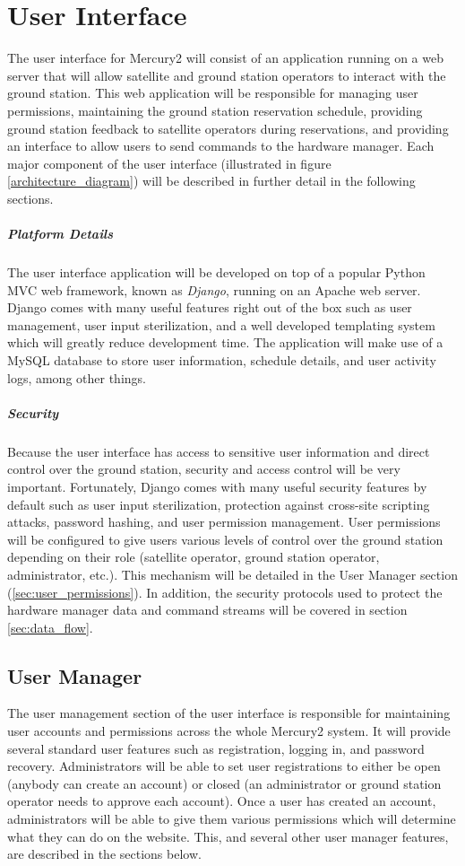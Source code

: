 \documentclass{mxl-design}
\begin{document}
\section{User Interface}
\label{sec:user_interface}
The user interface for Mercury2 will consist of an application running on a web server that will allow satellite and ground station operators to interact with the ground station. This web application will be responsible for managing user permissions, maintaining the ground station reservation schedule, providing ground station feedback to satellite operators during reservations, and providing an interface to allow users to send commands to the hardware manager. Each major component of the user interface (illustrated in figure \ref{architecture_diagram}) will be described in further detail in the following sections.

\subparagraph{Platform Details}
The user interface application will be developed on top of a popular Python MVC web framework, known as \textit{Django}, running on an Apache web server. Django comes with many useful features right out of the box such as user management, user input sterilization, and a well developed templating system which will greatly reduce development time. The application will make use of a MySQL database to store user information, schedule details, and user activity logs, among other things.

\subparagraph{Security}
Because the user interface has access to sensitive user information and direct control over the ground station, security and access control will be very important. Fortunately, Django comes with many useful security features by default such as user input sterilization, protection against cross-site scripting attacks, password hashing, and user permission management. User permissions will be configured to give users various levels of control over the ground station depending on their role (satellite operator, ground station operator, administrator, etc.). This mechanism will be detailed in the User Manager section (\ref{sec:user_permissions}). In addition, the security protocols used to protect the hardware manager data and command streams will be covered in section \ref{sec:data_flow}.

\subsection{User Manager}
\label{sec:user_manager}
The user management section of the user interface is responsible for maintaining user accounts and permissions across the whole Mercury2 system. It will provide several standard user features such as registration, logging in, and password recovery. Administrators will be able to set user registrations to either be open (anybody can create an account) or closed (an administrator or ground station operator needs to approve each account). Once a user has created an account, administrators will be able to give them various permissions which will determine what they can do on the website. This, and several other user manager features, are described in the sections below.
\end{document}
